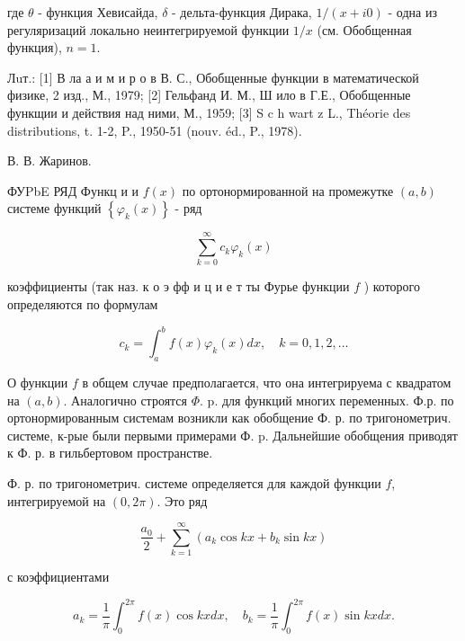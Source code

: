 \documentclass[10pt]{article}
\begin{document}
где $\theta$ - функция Хевисайда, $\delta$ - дельта-функция Дирака, $1 /(x+i 0)$ - одна из регуляризаций локально неинтегрируемой функции $1 / x$ (см. Обобщенная функция), $n=1$.



Лuт.: [1] В ла а и м и р о в В. С., Обобщенные функции в математической физике, 2 изд., М., 1979; [2] Гельфанд И. М., Ш ило в Г.Е., Обобщенные функщии и действия над ними, М., 1959; [3] S c h wart z L., Théorie des distributions, t. 1-2, P., 1950-51 (nouv. éd., P., 1978).



В. В. Жаринов.



ФУPbE РЯД Функц и и $f(x)$ по ортонормированной на промежутке $(a, b)$ системе функций $\left\{\varphi_{k}(x)\right\}$ - ряд



\[

\sum_{k=0}^{\infty} c_{k} \varphi_{k}(x)

\]



коэффициенты (так наз. к о э фф и ц и е т ты Фурье функции $f$ ) которого определяются по формулам



\[

c_{k}=\int_{a}^{b} f(x) \varphi_{k}(x) d x, \quad k=0,1,2, \ldots

\]



О функции $f$ в общем случае предполагается, что она интегрируема с квадратом на $(a, b)$. Аналогично строятся $\Phi$. p. для функций многих переменных. Ф.р. по ортонормированным системам возникли как обобщение Ф. р. по тригонометрич. системе, к-рые были первыми примерами Ф. p. Дальнейшие обобщения приводят к Ф. р. в гильбертовом пространстве.



Ф. р. по тригонометрич. системе определяется для каждой функции $f$, интегрируемой на $(0,2 \pi)$. Это ряд



\[

\frac{a_{0}}{2}+\sum_{k=1}^{\infty}\left(a_{k} \cos k x+b_{k} \sin k x\right)

\]



с коэффициентами



\[

a_{k}=\frac{1}{\pi} \int_{0}^{2 \pi} f(x) \cos k x d x, \quad b_{k}=\frac{1}{\pi} \int_{0}^{2 \pi} f(x) \sin k x d x .

\]
\end{document}
